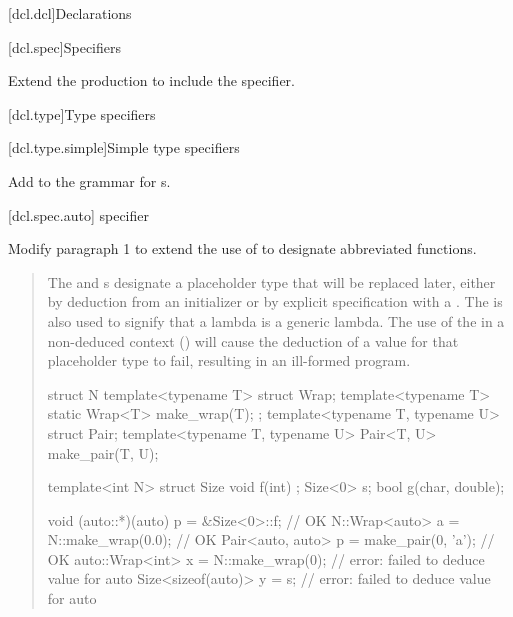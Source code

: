 
\setcounter{chapter}{6}
[dcl.dcl]{Declarations}


[dcl.spec]{Specifiers}

Extend the  production
to include the  specifier.

\begin{quote}
\begin{bnf}
\br
\end{bnf}
\end{quote}

\setcounter{subsection}{5}
[dcl.type]{Type specifiers}


\setcounter{subsubsection}{1}
[dcl.type.simple]{Simple type specifiers}
        
Add 
to the grammar for s.

\begin{quote}
\begin{bnf}
\br
\end{bnf}
\end{quote}

\setcounter{subsubsection}{3}
[dcl.spec.auto]{ specifier}

Modify paragraph 1 to extend the use of  to
designate abbreviated functions.

\begin{quote}
\setcounter{Paras}{0}
\pnum
The  and  
s designate a 
placeholder type that will be replaced later, either by deduction from 
an initializer or by explicit specification with a 
. The 
 
is also used to signify that a lambda is a generic lambda.
% 
\enternote
The use of the  
 in a non-deduced 
context () will cause the 
deduction of a value for that placeholder type to fail, resulting
in an ill-formed program.
\exitnote
% 
\enterexample
\begin{codeblock}
struct N {
  template<typename T> struct Wrap;
  template<typename T> static Wrap<T> make_wrap(T);
};
template<typename T, typename U> struct Pair;
template<typename T, typename U> Pair<T, U> make_pair(T, U);

template<int N> struct Size { void f(int) { }  };
Size<0> s;
bool g(char, double);

void (auto::*)(auto) p = &Size<0>::f;   // OK
N::Wrap<auto> a = N::make_wrap(0.0);    // OK
Pair<auto, auto> p = make_pair(0, 'a'); // OK
auto::Wrap<int> x = N::make_wrap(0);    // error: failed to deduce value for auto
Size<sizeof(auto)> y = s;               // error: failed to deduce value for auto
\end{codeblock}
\exitexample
\end{quote}

